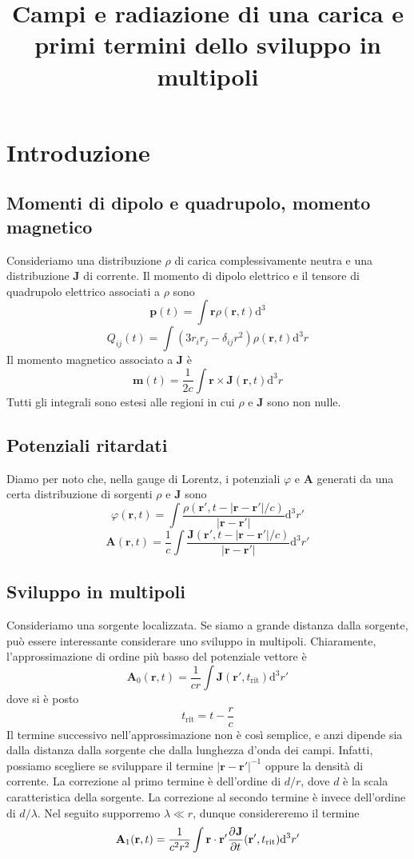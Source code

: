 \documentclass[a4paper,11pt]{article}
\title{Campi e radiazione di una carica e primi termini dello sviluppo in multipoli}
\date{}
\renewcommand{\d}{\mathrm{d}}
\renewcommand{\vec}[1]{\mathbf{#1}}
\renewcommand{\t}{t_{\mathrm{rit}}}
\begin{document}
	\maketitle
\section{Introduzione}
\subsection{Momenti di dipolo e quadrupolo, momento magnetico}
Consideriamo una distribuzione $\rho$ di carica complessivamente neutra e una distribuzione $\vec{J}$ di corrente. Il momento di dipolo elettrico e il tensore di quadrupolo elettrico associati a $\rho$ sono
\[\vec{p}(t)=\int\vec{r}\rho(\vec{r},t)\d ^3\]
\[Q_{ij}(t)=\int \left(3r_ir_j-\delta_{ij}r^2\right)\rho(\vec{r},t)\d^3r\]
Il momento magnetico associato a $\vec{J}$ è
\[\vec{m}(t)=\frac{1}{2c}\int\vec{r}\times\vec{J}(\vec{r},t)\d ^3r\]
Tutti gli integrali sono estesi alle regioni in cui $\rho$ e $\vec{J}$ sono non nulle.
\subsection{Potenziali ritardati}
Diamo per noto che, nella gauge di Lorentz, i potenziali $\varphi$ e $\vec{A}$ generati da una certa distribuzione di sorgenti $\rho$ e $\vec{J}$ sono
\[\varphi(\vec{r},t)=\int\frac{\rho(\vec{r}',t-|\vec{r}-\vec{r}'|/c)}{|\vec{r}-\vec{r}'|}\d^3r'\]
\[\vec{A}(\vec{r},t)=\frac{1}{c}\int\frac{\vec{J}(\vec{r}',t-|\vec{r}-\vec{r}'|/c)}{|\vec{r}-\vec{r}'|}\d^3r'\]
\subsection{Sviluppo in multipoli}
Consideriamo una sorgente localizzata. Se siamo a grande distanza dalla sorgente, può essere interessante considerare uno sviluppo in multipoli. Chiaramente, l'approssimazione di ordine più basso del potenziale vettore è
\[\vec{A}_0(\vec{r},t)=\frac{1}{cr}\int\vec{J}(\vec{r}',\t)\d^3r'\]
dove si è posto
\[\t=t-\frac{r}{c}\]
Il termine successivo nell'approssimazione non è così semplice, e anzi dipende sia dalla distanza dalla sorgente che dalla lunghezza d'onda dei campi. Infatti, possiamo scegliere se sviluppare il termine $|\vec{r}-\vec{r}'|^{-1}$ oppure la densità di corrente. La correzione al primo termine è dell'ordine di $d/r$, dove $d$ è la scala caratteristica della sorgente. La correzione al secondo termine è invece dell'ordine di $d/\lambda$. Nel seguito supporremo $\lambda\ll r$, dunque considereremo il termine
\[\vec{A}_1(\vec{r},t)=\frac{1}{c^2r^2}\int \vec{r}\cdot\vec{r}'\pder{\vec{J}}{t}(\vec{r}',\t)\d^3r'\]
\vspace{10 mm}
\end{document}
